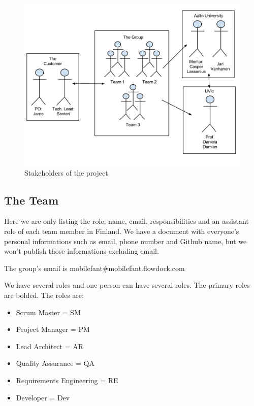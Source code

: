 \begin{figure}[H]
\centering
\includegraphics[width=1\textwidth]{imgs/stakeholders.png}
\caption{Stakeholders of the project}
\label{fig:stakeholders}
\end{figure}

\subsection{The Team}

Here we are only listing the role, name, email, responsibilities and an
assistant role of each team member in Finland. We have a document with
everyone's personal informations such as email, phone number and Github name,
but we won't publish those informations excluding email.

The group's email is mobilefant\#mobilefant.flowdock.com

We have several roles and one person can have several roles. The primary roles
are bolded. The roles are:

\begin{itemize}
\item Scrum Master = SM
\item Project Manager = PM
\item Lead Architect = AR
\item Quality Assurance = QA
\item Requirements Engineering = RE
\item Developer = Dev
\end{itemize}

